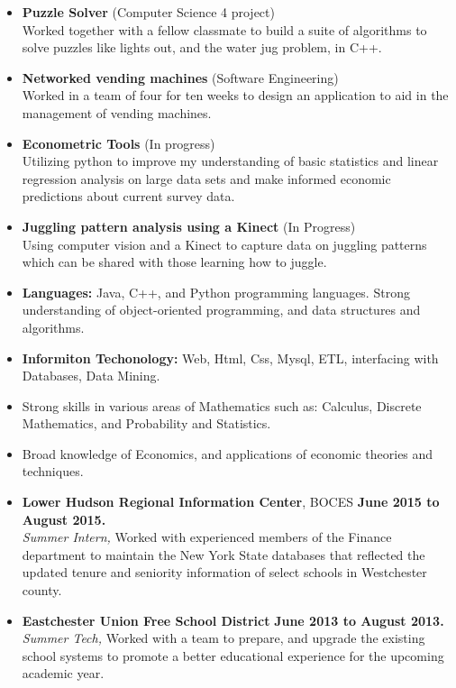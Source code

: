\documentclass[10pt]{article}
\begin{document}
\begin{itemize}[topsep=.3ex, itemsep=0ex, partopsep=0ex, parsep=1ex]
	\item[] {\bf Puzzle Solver} (Computer Science 4 project)\\
	Worked together with a fellow classmate to build a suite of algorithms to solve puzzles like lights out, and the water jug problem, in C++.
	\item[] {\bf Networked vending machines} (Software Engineering)\\
	Worked in a team of four for ten weeks to design an application to aid in the management of vending machines.
	\item[] {\bf Econometric Tools} (In progress)\\
	Utilizing python to improve my understanding of basic statistics and linear regression analysis on large data sets and make informed economic predictions about current survey data.
	\item[] {\bf Juggling pattern analysis using a Kinect} (In Progress)\\
	Using computer vision and a Kinect to capture data on juggling patterns which can be shared with those learning how to juggle.
\end{itemize}
\vspace{1ex}
\begin{itemize} [topsep=.3ex, itemsep=0ex, partopsep=0ex, parsep=1ex]
	\item[] {\bf Languages:} Java, C++, and Python programming languages. Strong understanding of object-oriented programming, and data structures and algorithms.
 	\item[] {\bf Informiton Techonology:} Web, Html, Css, Mysql, ETL, interfacing with Databases, Data Mining.
 	\item[] Strong skills in various areas of Mathematics such as: Calculus, Discrete Mathematics, and Probability and Statistics.
	\item[] Broad knowledge of Economics, and applications of economic theories and techniques.
\end{itemize}
\vspace{1ex}
\begin{itemize} [topsep=.3ex, itemsep=0ex, partopsep=0ex, parsep=1ex]
	\item[]{{\bf Lower Hudson Regional Information Center}, BOCES \hfill {\bf June 2015 to August 2015.}}\\
	{\it Summer Intern,}
	Worked with experienced members of the Finance department to maintain the New York
	State databases that reflected the updated tenure and seniority information of select schools in Westchester county.
	\item[]{{\bf Eastchester Union Free School District} \hfill { \bf June 2013 to August 2013.}}\\
		{\it Summer Tech,}
		{Worked with a team to prepare, and upgrade the existing school systems to promote a better educational experience for the upcoming academic year.}
\end{itemize}
\end{document}
